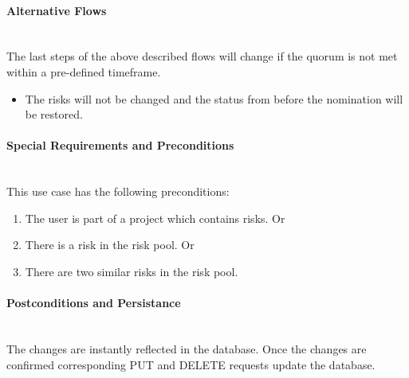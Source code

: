 \paragraph*{Alternative Flows}\mbox{}\\
The last steps of the above described flows will change if the quorum is not met within a pre-defined timeframe.
\begin{itemize}
	\vspace{-3mm}
	\setlength\itemsep{-1em}
	\item The risks will not be changed and the status from before the nomination will be restored.
\end{itemize}

\paragraph*{Special Requirements and Preconditions}\mbox{}\\
This use case has the following preconditions:
\begin{enumerate}
	\vspace{-3mm}
	\setlength\itemsep{-1em}
	\item The user is part of a project which contains risks.
	Or
	\item There is a risk in the risk pool.
	Or
	\item There are two similar risks in the risk pool.
\end{enumerate}

\paragraph*{Postconditions and Persistance}\mbox{}\\
The changes are instantly reflected in the database. Once the changes are confirmed corresponding PUT and DELETE requests update the database.